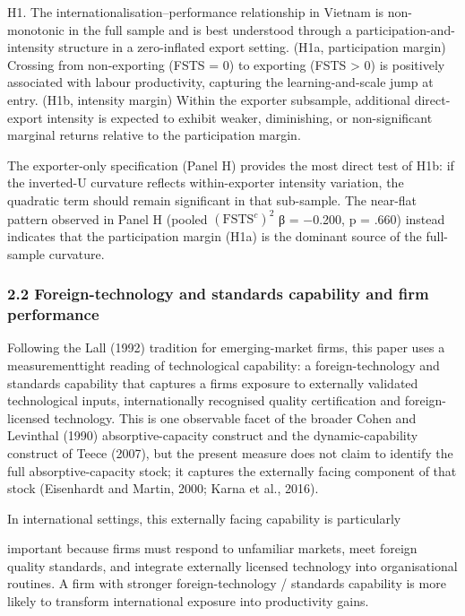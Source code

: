 \documentclass[12pt,a4paper]{article}
\begin{document}
H1. The internationalisation--performance relationship in Vietnam is
non-monotonic in the full sample and is best understood through a
participation-and-intensity structure in a zero-inflated export setting.
(H1a, participation margin) Crossing from non-exporting (FSTS = 0) to
exporting (FSTS \textgreater{} 0) is positively associated with labour
productivity, capturing the learning-and-scale jump at entry. (H1b,
intensity margin) Within the exporter subsample, additional
direct-export intensity is expected to exhibit weaker, diminishing, or
non-significant marginal returns relative to the participation margin.

The exporter-only specification (Panel H) provides the most direct test
of H1b: if the inverted-U curvature reflects within-exporter intensity
variation, the quadratic term should remain significant in that
sub-sample. The near-flat pattern observed in Panel H (pooled
\((\mathrm{FSTS}^{c})^2\) β = −0.200, p = .660) instead indicates that
the participation margin (H1a) is the dominant source of the full-sample
curvature.

\hypertarget{22-foreign-technology-and-standards-capability-and-firm-performance}{%
\subsubsection{2.2 Foreign-technology and standards capability and firm
performance}\label{22-foreign-technology-and-standards-capability-and-firm-performance}}

Following the Lall (1992) tradition for emerging-market firms, this
paper uses a measurementtight reading of technological capability: a
foreign-technology and standards capability that captures a
firm\textquotesingle s exposure to externally validated technological
inputs, internationally recognised quality certification and
foreign-licensed technology. This is one observable facet of the broader
Cohen and Levinthal (1990) absorptive-capacity construct and the
dynamic-capability construct of Teece (2007), but the present measure
does not claim to identify the full absorptive-capacity stock; it
captures the externally facing component of that stock (Eisenhardt and
Martin, 2000; Karna et al., 2016).

In international settings, this externally facing capability is
particularly

important because firms must respond to unfamiliar markets, meet foreign
quality standards, and integrate externally licensed technology into
organisational routines. A firm with stronger foreign-technology /
standards capability is more likely to transform international exposure
into productivity gains.
\end{document}
